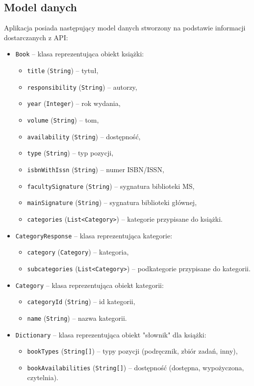 \documentclass[twoside]{projektInzynierskiMS}
\begin{document}
\subsection{Model danych}
Aplikacja posiada następujący model danych stworzony na podstawie informacji dostarczanych z API:

\begin{itemize}
\item \verb`Book` -- klasa reprezentująca obiekt książki:
\begin{itemize}
\item \verb`title` (\verb`String`) -- tytuł,
\item \verb`responsibility` (\verb`String`) -- autorzy,
\item \verb`year` (\verb`Integer`) -- rok wydania,
\item \verb`volume` (\verb`String`) -- tom,
\item \verb`availability` (\verb`String`) -- dostępność,
\item \verb`type` (\verb`String`) -- typ pozycji,
\item \verb`isbnWithIssn` (\verb`String`) -- numer ISBN/ISSN,
\item \verb`facultySignature` (\verb`String`) -- sygnatura biblioteki MS,
\item \verb`mainSignature` (\verb`String`) -- sygnatura biblioteki głównej,
\item \verb`categories` (\verb`List<Category>`) -- kategorie przypisane do książki.
\end{itemize}
\item \verb`CategoryResponse` -- klasa reprezentująca kategorie:
\begin{itemize}
\item \verb`category` (\verb`Category`) -- kategoria,
\item \verb`subcategories` (\verb`List<Category>`) -- podkategorie przypisane do kategorii.
\end{itemize}
\item \verb`Category` -- klasa reprezentująca obiekt kategorii:
\begin{itemize}
\item \verb`categoryId` (\verb`String`) -- id kategorii,
\item \verb`name` (\verb`String`) -- nazwa kategorii.
\end{itemize}
\item \verb`Dictionary` -- klasa reprezentująca obiekt "słownik" dla książki:
\begin{itemize}
\item \verb`bookTypes` (\verb`String[]`) -- typy pozycji (podręcznik, zbiór zadań, inny),
\item \verb`bookAvailabilities` (\verb`String[]`) -- dostępność (dostępna, wypożyczona, czytelnia).
\end{itemize}
\end{itemize}
\end{document}

